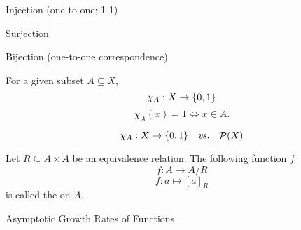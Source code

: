 
\begin{frame}{}
\end{frame}

\begin{frame}{}
  \begin{center}
    Injection (one-to-one; 1-1)

    \vspace{0.60cm}
    Surjection

    \vspace{0.60cm}
    Bijection (one-to-one correspondence)
  \end{center}
\end{frame}

\begin{frame}{}
  \begin{definition}
    For a given subset $A \subseteq X$,
    \[
      \chi_{A}: X \to \{0, 1\}
    \]
    \[
      \chi_{A}(x) = 1 \iff x \in A.
    \]
  \end{definition}

  \pause
  \vspace{0.30cm}
  \[
    \chi_{A}: X \to \{0, 1\} \quad\text{\it vs.}\quad \mathcal{P}(X)
  \]
\end{frame}

\begin{frame}{}
  \begin{definition}
    Let $R \subseteq A \times A$ be an equivalence relation.
    The following function $f$
    \[
      f: A \to A/R
    \]
    \[
      f: a \mapsto [a]_{R}
    \]
    is called the  on $A$.
  \end{definition}

\end{frame}

\begin{frame}{}
  \begin{center}
    Asymptotic Growth Rates of Functions
  \end{center}

  \begin{columns}
  \end{columns}

  \vspace{0.30cm}
  \begin{center}
  \end{center}
\end{frame}
